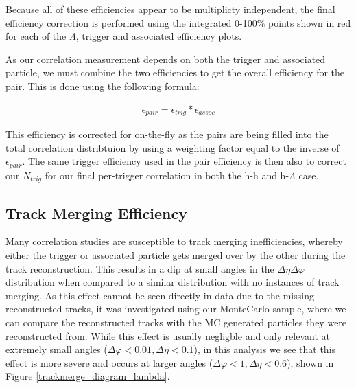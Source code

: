 \documentclass[ALICE,manyauthors]{ALICE_analysis_notes}
\begin{document}
Because all of these efficiencies appear to be multiplicty independent, the final efficiency correction is performed using the integrated 0-100\% points shown in red for each of the $\Lambda$, trigger and associated efficiency plots.

As our correlation measurement depends on both the trigger and associated particle, we must combine the two efficiencies to get the overall efficiency for the pair.  This is done using the following formula:

\begin{align*}
    \epsilon_{pair} = \epsilon_{trig}*\epsilon_{assoc}
\end{align*}

This efficiency is corrected for on-the-fly as the pairs are being filled into the total correlation distribtuion by using a weighting factor equal to the inverse of $\epsilon_{pair}$. The same trigger efficiency used in the pair efficiency is then also to correct our $N_{trig}$ for our final per-trigger correlation in both the h-h and h-$\Lambda$ case.

\subsection{Track Merging Efficiency} 
\label{trackmerge_efficiency}

Many correlation studies are susceptible to track merging inefficiencies, whereby either the trigger or associated particle gets merged over by the other during the track reconstruction. This results in a dip at small angles in the $\Delta\eta\Delta\varphi$ distribution when compared to a similar distribution with no instances of track merging. As this effect cannot be seen directly in data due to the missing reconstructed tracks, it was investigated using our MonteCarlo sample, where we can compare the reconstructed tracks with the MC generated particles they were reconstructed from. While this effect is usually negligble and only relevant at extremely small angles ($\Delta\varphi < 0.01, \Delta\eta < 0.1$), in this analysis we see that this effect is more severe and occurs at larger angles ($\Delta\varphi < 1, \Delta\eta < 0.6$), shown in Figure \ref{trackmerge_diagram_lambda}. 
\end{document}
